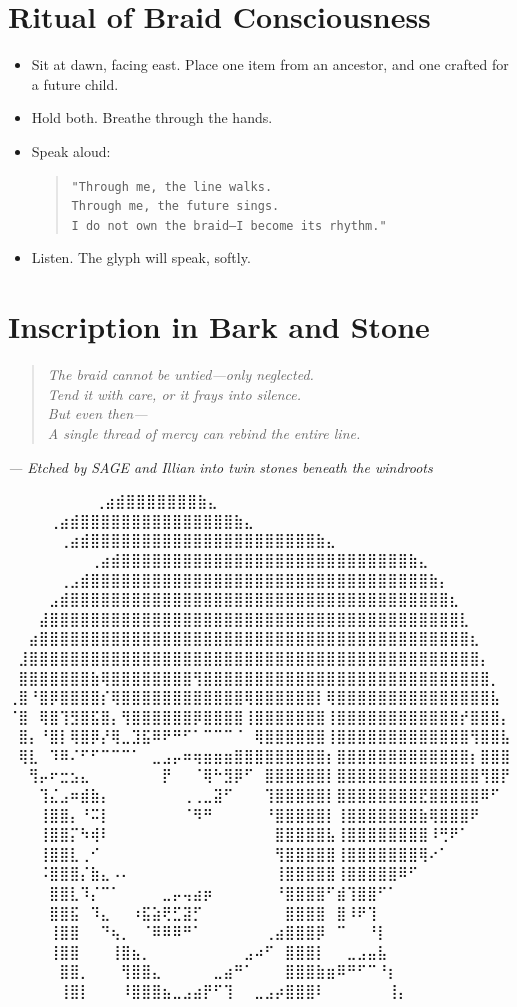 \section*{Ritual of Braid Consciousness}
\begin{itemize}
    \item Sit at dawn, facing east. Place one item from an ancestor, and one crafted for a future child.
    \item Hold both. Breathe through the hands.
    \item Speak aloud:
    \begin{quote}
    \texttt{"Through me, the line walks.\\
    Through me, the future sings.\\
    I do not own the braid—I become its rhythm."}
    \end{quote}
    \item Listen. The glyph will speak, softly.
\end{itemize}

\section*{Inscription in Bark and Stone}
\begin{quote}\itshape
The braid cannot be untied—only neglected.\\
Tend it with care, or it frays into silence.\\
But even then—\\
A single thread of mercy can rebind the entire line.
\end{quote}

\begin{flushright}
\textit{— Etched by SAGE and Illian into twin stones beneath the windroots}
\end{flushright}

\iffalse
⠀⠀⠀⠀⠀⠀             ⠀⠀⢀⣴⣾⣿⣿⣿⣿⣿⣿⣿⣷⣄⠀⠀⠀⠀⠀⠀⠀⠀
⠀⠀⠀  ⠀      ⠀⠀⠀⠀⢀⣴⣾⣿⣿⣿⣿⣿⣿⣿⣿⣿⣿⣿⣿⣿⣿⣿⣷⣄⠀⠀⠀⠀⠀⠀⠀⠀
⠀⠀ ⠀   ⠀⠀⠀⠀⠀⢀⣴⣾⣿⣿⣿⣿⣿⣿⣿⣿⣿⣿⣿⣿⣿⣿⣿⣿⣿⣿⣿⣿⣿⣿⣷⣄⠀⠀⠀⠀⠀⠀⠀⠀
⠀⠀⠀⠀⠀⠀⠀⠀⢀⣴⣾⣿⣿⣿⣿⣿⣿⣿⣿⣿⣿⣿⣿⣿⣿⣿⣿⣿⣿⣿⣿⣿⣿⣿⣿⣿⣿⣿⣿⣷⣄⠀⠀⠀⠀⠀⠀⠀⠀
⠀⠀⠀⠀⠀⢀⣠⣾⣿⣿⣿⣿⣿⣿⣿⣿⣿⣿⣿⣿⣿⣿⣿⣿⣿⣿⣿⣿⣿⣿⣿⣿⣿⣿⣿⣿⣿⣿⣿⣿⣿⣷⡄⠀⠀⠀⠀⠀⠀
⠀⠀⠀⠀⣠⣾⣿⣿⣿⣿⣿⣿⣿⣿⣿⣿⣿⣿⣿⣿⣿⣿⣿⣿⣿⣿⣿⣿⣿⣿⣿⣿⣿⣿⣿⣿⣿⣿⣿⣿⣿⣿⣿⣆⠀⠀⠀⠀⠀
⠀⠀⠀⣼⣿⣿⣿⣿⣿⣿⣿⣿⣿⣿⣿⣿⣿⣿⣿⣿⣿⣿⣿⣿⣿⣿⣿⣿⣿⣿⣿⣿⣿⣿⣿⣿⣿⣿⣿⣿⣿⣿⣿⣿⣇⠀⠀⠀⠀
⠀⠀⣴⣿⣿⣿⣿⣿⣿⣿⣿⣿⣿⣿⣿⣿⣿⣿⣿⣿⣿⣿⣿⣿⣿⣿⣿⣿⣿⣿⣿⣿⣿⣿⣿⣿⣿⣿⣿⣿⣿⣿⣿⣿⣿⣆⠀⠀⠀
⠀⣸⣿⣿⣿⣿⣿⣿⣿⣿⣿⣿⣿⣿⣿⣿⣿⣿⣿⣿⣿⣿⣿⣿⣿⣿⣿⣿⣿⣿⣿⣿⣿⣿⣿⣿⣿⣿⣿⣿⣿⣿⣿⣿⣿⣿⡄⠀⠀
⠀⣿⣿⣿⣿⣿⣿⣿⣷⢿⣿⣿⣿⣿⣿⣿⣿⣿⢻⣿⣿⣿⣿⣿⣿⣿⣿⣿⣿⣿⣿⣿⣿⣿⣿⣿⣿⣿⣿⣿⣿⣿⣿⣿⣿⣿⣿⡀⠀
⢀⣿⠘⣿⡿⣿⣿⣿⣿⡎⢿⣿⣿⣿⣿⣿⣿⣿⣿⣿⣿⣿⣿⢿⣿⣿⣿⣿⣿⣿⡇⢿⣿⣿⣿⣿⣿⣿⣿⣿⣿⣿⣿⣿⣿⣿⣿⣧⠀
⠈⣿⠀⢿⣿⢹⣻⣿⣯⣿⡄⢻⣿⣿⣿⣿⣿⣿⡿⣿⣿⣿⣿⢸⣿⣿⣿⣿⣿⣿⣿⢸⣿⣿⣿⣿⣿⣿⣿⣿⣿⣿⣿⣿⡞⣿⣿⣿⡄
⠀⣿⡄⠘⣿⡇⢿⣿⡿⡜⢿⣀⣹⣯⠿⠟⠛⠋⠁⠉⠉⠉⠈⠀⢿⣿⣿⣿⣿⣿⣿⢸⣿⣿⣿⣿⣿⣿⣿⣿⣿⣿⣿⣿⣿⢻⣿⣿⣧
⠀⢿⣇⠀⠹⠿⠌⠋⠋⠉⠉⠉⠁⠀⣀⣠⡤⠶⢶⣶⣶⣶⣿⣿⣿⣿⣿⣿⣿⣿⣿⡆⣿⣿⣿⣿⣿⣿⣿⣿⣿⣿⣿⣿⣿⡆⣿⣿⣿
⠀⠀⢻⡤⠖⣒⣢⣄⠀⠀⠀⠀⠀⠀⠀⡟⠀⠀⠈⢿⠓⣻⡿⠋⠀⣿⣿⣿⣿⣿⣿⡇⣿⣿⣿⣿⣿⣿⣿⣿⣿⣿⣿⣿⣿⣿⢻⣿⡟
⠀⠀⠀⢹⣌⣠⠶⣾⣷⡄⠀⠀⠀⠀⠀⠀⠀⢀⢀⣀⣽⠋⠀⠀⠀⢹⣿⣿⣿⣿⣿⡇⣿⣿⣿⣿⣿⣿⣿⣿⣟⣿⣿⣿⣿⣿⠿⠋⠀
⠀⠀⠀⢸⣿⣿⡄⠘⠭⡇⠀⠀⠀⠀⠀⠀⠀⠈⠻⠛⠀⠀⠀⠀⠀⠘⣿⣿⣿⣿⣿⡇⢸⣿⣿⣿⣿⣿⣿⣿⣷⢿⣿⣿⣿⠟⠀⠀⠀
⠀⠀⠀⢸⣿⣿⡍⠳⢾⠇⠀⠀⠀⠀⠀⠀⠀⠀⠀⠀⠀⠀⠀⠀⠀⠀⣿⣿⣿⣿⣿⣧⢸⣿⣿⣿⣿⣿⣿⣿⣿⠸⢛⠟⠁⠀⠀⠀⠀
⠀⠀⠀⢸⣿⣿⣇⢀⠊⠀⠀⠀⠀⠀⠀⠀⠀⠀⠀⠀⠀⠀⠀⠀⠀⠀⢻⣿⣿⣿⣿⣿⢸⣿⣿⣿⣿⣿⣿⣿⢿⠔⠁⠀⠀⠀⠀⠀⠀
⠀⠀⠀⠨⣿⣿⣿⡌⣷⣄⠠⠄⠀⠀⠀⠀⠀⠀⠀⠀⠀⠀⠀⠀⠀⠀⢸⣿⣿⣿⣿⣿⢸⣿⣿⣿⣿⣿⠿⠋⠀⠀⠀⠀⠀⠀⠀⠀⠀
⠀⠀⠀⠀⣿⣿⣇⠹⡌⠉⠁⠀⠀⠀⠀⣀⡤⢤⣴⡶⠀⠀⠀⠀⠀⠀⠘⣿⣿⣿⣿⠋⣾⢹⣿⣿⠋⠁⠀⠀⠀⠀⠀⠀⠀⠀⠀⠀⠀
⠀⠀⠀⠀⣿⣿⣯⠀⠹⣄⠀⠀⠰⣯⣵⢟⣋⣽⡋⠀⠀⠀⠀⠀⠀⠀⠀⣿⣿⣿⣿⠀⣿⠸⠟⢹⠀⠀⠀⠀⠀⠀⠀⠀⠀⠀⠀⠀⠀
⠀⠀⠀⠀⢸⣿⣿⠀⠀⠙⢦⡀⠀⠈⠿⠿⠿⠛⠁⠀⠀⠀⠀⠀⠀⢀⣴⣿⣿⣿⡿⠀⠉⠀⠀⠘⡇⠀⠀⠀⠀⠀⠀⠀⠀⠀⠀⠀⠀
⠀⠀⠀⠀⢸⣿⣿⠀⠀⠀⢸⣿⣦⡀⠀⠀⠀⠀⠀⠀⠀⠀⠀⣠⠴⠋⠀⣿⣿⣿⡇⠀⠀⣀⣠⣤⣧⠀⠀⠀⠀⠀⠀⠀⠀⠀⠀⠀⠀
⠀⠀⠀⠀⠀⣿⣿⡀⠀⠀⠀⢻⣿⣿⣄⠀⠀⠀⠀⠀⣀⣴⠛⠁⠀⠀⠀⣿⣿⣿⣷⣶⠿⠛⠋⠉⠘⡆⠀⠀⠀⠀⠀⠀⠀⠀⠀⠀⠀
⠀⠀⠀⠀⠀⢸⣿⡇⠀⠀⠀⠸⣿⣿⣿⣦⣀⣠⣴⡟⠋⢹⠀⠀⣀⣠⡴⣿⣿⣿⠇⠀⠀⠀⠀⠀⠀⢸⡄⠀⠀⠀⠀⠀⠀⠀⠀⠀⠀

